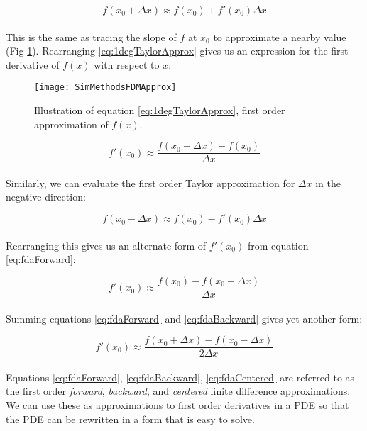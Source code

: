 {   \begin{equation}\label{eq:1degTaylorApprox}
  f(x_{0} + \Delta  x) \approx f(x_{0}) + f'(x_{0})\Delta x
  \end{equation}
    \\
This is the same as tracing the slope of $f$ at $x_{0}$ to approximate a nearby value (Fig \ref{fig:FDMSlopeApprox}).  Rearranging \ref{eq:1degTaylorApprox} gives us an expression for the first derivative of $f(x)$ with respect to $x$:

\begin{figure}
  \texttt{[image: SimMethodsFDMApprox]}
  \caption{Illustration of equation \ref{eq:1degTaylorApprox}, first order approximation of $f(x)$.}
  \label{fig:FDMSlopeApprox}
\end{figure}

 \begin{equation}\label{eq:fdaForward}
 f'(x_{0}) \approx \frac{f(x_{0} + \Delta  x) - f(x_{0})}{\Delta  x}
  \end{equation}
    \\
Similarly, we can evaluate the first order Taylor approximation for $\Delta x$ in the negative direction:

     \begin{equation}
 f(x_{0} - \Delta  x) \approx f(x_{0}) - f'(x_{0})\Delta x
  \end{equation}
    \\
  Rearranging this gives us an alternate form of $ f'(x_{0})$ from equation \ref{eq:fdaForward}:

 \begin{equation}\label{eq:fdaBackward}
 f'(x_{0}) \approx \frac{f(x_{0}) - f(x_{0} - \Delta  x)}{\Delta  x}
  \end{equation}
    \\
Summing equations \ref{eq:fdaForward} and \ref{eq:fdaBackward} gives yet another form:
  
     \begin{equation}\label{eq:fdaCentered}
 f'(x_{0}) \approx \frac{f(x_{0} + \Delta  x) - f(x_{0} - \Delta  x)}{2\Delta x}
  \end{equation}
  \\
  Equations \ref{eq:fdaForward}, \ref{eq:fdaBackward}, \ref{eq:fdaCentered} are referred to as the first order \textit{forward}, \textit{backward}, and \textit{centered} finite difference approximations.  We can use these as approximations to first order derivatives in a PDE so that the PDE can be rewritten in a form that is easy to solve.
  
}
